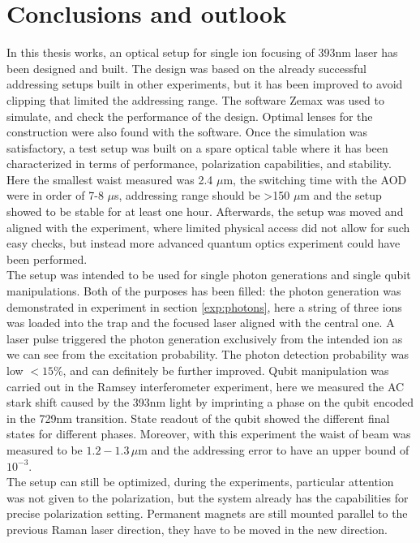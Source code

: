 
\chapter{Conclusions and outlook}
In this thesis works, an optical setup for single ion focusing of 393nm laser has been designed and built. The design was based on the already successful addressing setups built in other experiments, but it has been improved to avoid clipping that limited the addressing range. The software Zemax was used to simulate, and check the performance of the design. Optimal lenses for the construction were also found with the software. Once the simulation was satisfactory, a test setup was built on a spare optical table where it has been characterized in terms of performance, polarization capabilities, and stability. Here the smallest waist measured was 2.4 $\mu$m, the switching time with the AOD were in order of 7-8 $\mu$s, addressing range should be >150 $\mu$m and the setup showed to be stable for at least one hour. Afterwards, the setup was moved and aligned with the experiment, where limited physical access did not allow for such easy checks, but instead more advanced quantum optics experiment could have been performed.\\
The setup was intended to be used for single photon generations and single qubit manipulations. Both of the purposes has been filled: the photon generation was demonstrated in
experiment in section \ref{exp:photons}, here a string of three ions was loaded into the trap and the focused laser aligned with the central one. A laser pulse triggered the photon generation exclusively from the intended ion as we can see from the excitation probability. The photon detection probability was low $<15\%$, and can definitely be further improved. Qubit manipulation was carried out in the Ramsey interferometer experiment, here we measured the AC stark shift caused by the 393nm light by imprinting a phase on the qubit encoded in the 729nm transition. State readout of the qubit showed the different final states for different phases. Moreover, with this experiment the waist of beam was measured to be $1.2-1.3\,\mu$m and the addressing error to have an upper bound of $10^{-3}$.\\
The setup can still be optimized, during the experiments, particular attention was not given to the polarization, but the system already has the capabilities for precise polarization setting. Permanent magnets are still mounted parallel to the previous Raman laser direction, they have to be moved in the new direction.\\
